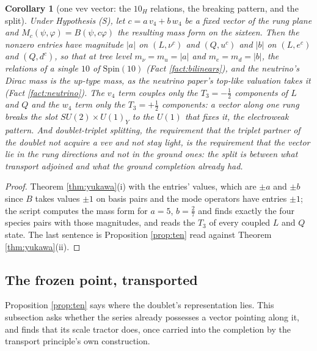 \documentclass[11pt]{article}
\newtheorem{corollary}[theorem]{Corollary}
\theoremstyle{definition}
\begin{document}
\begin{corollary}[one vev vector: the $10_{H}$ relations, the breaking pattern, and the split]\label{cor:vev}
Under Hypothesis (S), let $c = a\,v_{4} + b\,w_{4}$ be a fixed vector of the rung plane and $M_{c}(\psi, \varphi) = B(\psi, c\varphi)$ the resulting mass form on the sixteen. Then the nonzero entries have magnitude $|a|$ on $(L, \nu^{c})$ and $(Q, u^{c})$ and $|b|$ on $(L, e^{c})$ and $(Q, d^{c})$, so that at tree level $m_{\nu} = m_{u} = |a|$ and $m_{e} = m_{d} = |b|$, the relations of a single $10$ of $\mathrm{Spin}(10)$ (Fact \ref{fact:bilinears}), and the neutrino's Dirac mass is the up-type mass, as the neutrino paper's top-like valuation takes it (Fact \ref{fact:neutrino}). The $v_{4}$ term couples only the $T_{3} = -\tfrac12$ components of $L$ and $Q$ and the $w_{4}$ term only the $T_{3} = +\tfrac12$ components: a vector along one rung breaks the slot $SU(2) \times U(1)_{Y}$ to the $U(1)$ that fixes it, the electroweak pattern. And doublet-triplet splitting, the requirement that the triplet partner of the doublet not acquire a vev and not stay light, is the requirement that the vector lie in the rung directions and not in the ground ones: the split is between what transport adjoined and what the ground completion already had.
\end{corollary}

\begin{proof}
Theorem \ref{thm:yukawa}(i) with the entries' values, which are $\pm a$ and $\pm b$ since $B$ takes values $\pm 1$ on basis pairs and the mode operators have entries $\pm 1$; the script computes the mass form for $a = 5$, $b = \tfrac27$ and finds exactly the four species pairs with those magnitudes, and reads the $T_{3}$ of every coupled $L$ and $Q$ state. The last sentence is Proposition \ref{prop:ten} read against Theorem \ref{thm:yukawa}(ii).
\end{proof}

\subsection{The frozen point, transported}\label{subsec:lift}

Proposition \ref{prop:ten} says where the doublet's representation lies. This subsection asks whether the series already possesses a vector pointing along it, and finds that its scale tractor does, once carried into the completion by the transport principle's own construction.
\end{document}
